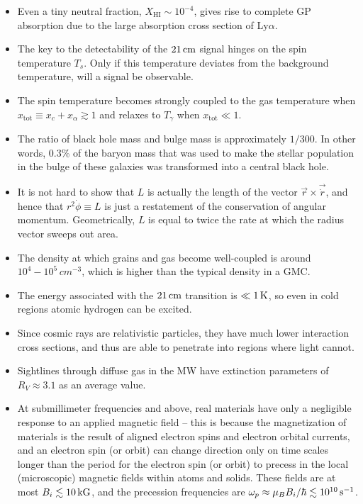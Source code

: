 \documentclass[a4paper,10pt]{article}
\begin{document}
\begin{itemize}
    \item Even a tiny neutral fraction, $X_\mathrm{HI}\sim10^{-4}$, gives rise to complete GP absorption due to the large absorption cross section of Ly$\alpha$.
    \item The key to the detectability of the $21\,{\rm cm}$ signal hinges on the spin temperature $T_s$. Only if this temperature deviates from the background temperature, will a signal be observable.
    \item The spin temperature becomes strongly coupled to the gas temperature when $x_\mathrm{tot}\equiv x_c+x_\alpha\gtrsim1$ and relaxes to $T_\gamma$ when $x_\mathrm{tot}\ll1$.
    \item The ratio of black hole mass and bulge mass is approximately $1/300$. In other words, 0.3\% of the baryon mass that was used to make the stellar population in the bulge of these galaxies was transformed into a central black hole.
    \item It is not hard to show that $L$ is actually the length of the vector $\vec{r}\times\vec{\dot{r}}$, and hence that $r^2\dot{\phi}\equiv L$ is just a restatement of the conservation of angular momentum. Geometrically, $L$ is equal to twice the rate at which the radius vector sweeps out area.
    \item The density at which grains and gas become well-coupled is around $10^4-10^5\,{cm^{-3}}$, which is higher than the typical density in a GMC.
    \item The energy associated with the $21\,{\rm cm}$ transition is $\ll1\,{\rm K}$, so even in cold regions atomic hydrogen can be excited.
    \item Since cosmic rays are relativistic particles, they have much lower interaction cross sections, and thus are able to penetrate into regions where light cannot.
    \item Sightlines through diffuse gas in the MW have extinction parameters of $R_V\approx3.1$ as an average value.
    \item At submillimeter frequencies and above, real materials have only a negligible response to an applied magnetic field -- this is because the magnetization of materials is the result of aligned electron spins and electron orbital currents, and an electron spin (or orbit) can change direction only on time scales longer than the period for the electron spin (or orbit) to precess in the local (microscopic) magnetic fields within atoms and solids. These fields are at most $B_i\lesssim10\,{\rm kG}$, and the precession frequencies are $\omega_p\approx \mu_BB_i/\hbar\lesssim10^{10}\,{\rm s^{-1}}$.

\end{itemize}
\end{document}
